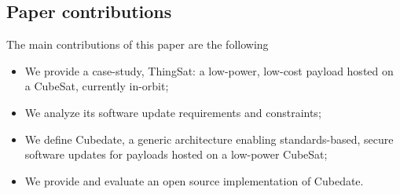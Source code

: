 \subsection*{Paper contributions}
The main contributions of this paper are the following
\begin{itemize}
    \item We provide a case-study, ThingSat: a low-power, low-cost payload hosted on a CubeSat, currently in-orbit;
    \item We analyze its software update requirements and constraints;
    \item We define Cubedate, a generic architecture enabling standards-based, secure software updates for payloads hosted on a low-power CubeSat;
    \item We provide and evaluate an open source implementation of Cubedate.
\end{itemize}
